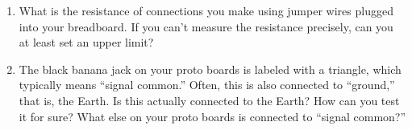 \begin{enumerate}[wide]
\item What is the resistance of connections you make using jumper wires plugged into your breadboard.  If you can't measure the resistance precisely, can you at least set an upper limit?

\item The black banana jack on your proto boards is labeled with a triangle, which typically means ``signal common.'' Often, this is also connected to ``ground,'' that is, the Earth.  Is this actually connected to the Earth?  How can you test it for sure?  What else on your proto boards is connected to ``signal common?''

\end{enumerate}
\begin{enumerate}


\begin{minipage}{.75\textwidth}


\end{minipage}
\end{enumerate}
